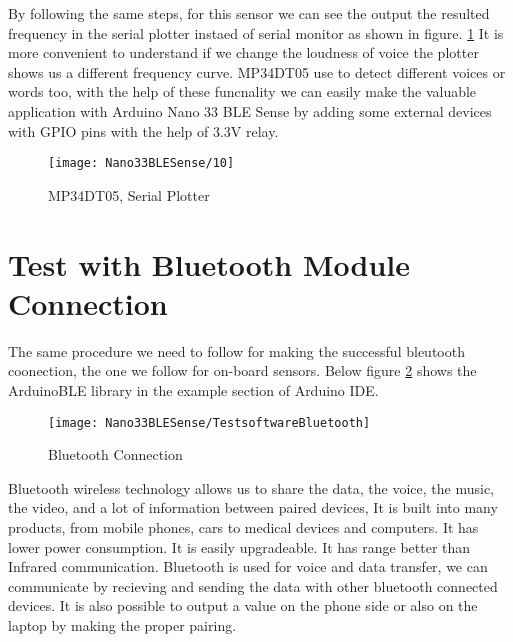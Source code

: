 By following the same steps, for this sensor we can see the output the resulted frequency in the serial plotter instaed of serial monitor as shown in figure.  \ref{fig:8}  It is more convenient to understand if we change the loudness of voice the plotter shows us a different frequency curve. MP34DT05 use to detect different voices or words too, with the help of these funcnality we can easily make the valuable application with Arduino Nano 33 BLE Sense by adding some external devices with GPIO pins with the help of 3.3V relay.

\begin{figure}[htbp]
	\centering
	\texttt{[image: Nano33BLESense/10]}
	\caption{MP34DT05, Serial Plotter}
	\label{fig:8}
\end{figure}

\section{Test with Bluetooth Module Connection}

The same procedure we need to follow for making the successful bleutooth coonection, the one we follow for on-board sensors. Below figure \ref{fig:testsoftware-fur-bluetooth} shows the ArduinoBLE library in the example section of Arduino IDE.



\begin{figure}[h]
	\centering
	\texttt{[image: Nano33BLESense/TestsoftwareBluetooth]}
	\caption{Bluetooth Connection}
	\label{fig:testsoftware-fur-bluetooth}
\end{figure}

Bluetooth wireless technology allows us to share the data, the voice, the music, the video, and a lot of information between paired devices, It is built into many products, from mobile phones, cars to medical devices and computers. It has lower power consumption. It is easily upgradeable. It has range better than Infrared communication. Bluetooth is used for voice and data transfer, we can communicate by recieving and sending the data with other bluetooth connected devices. It is also possible to output a value on the phone side or also on the laptop by making the proper pairing. 


